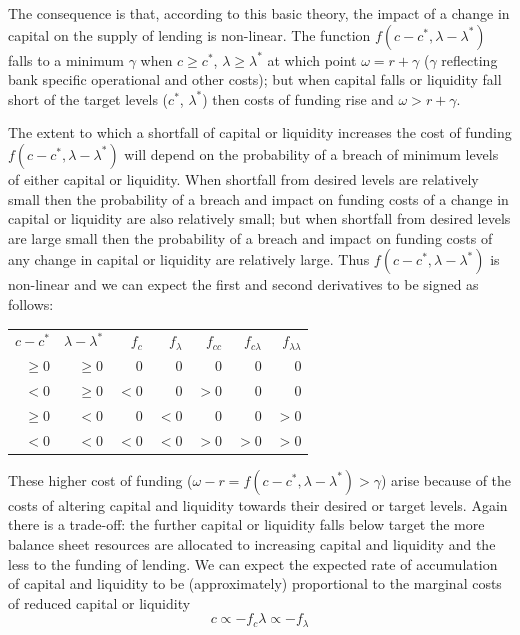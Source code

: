 \documentclass[
  12,
]{article}
\begin{document}
The consequence is that, according to this basic theory, the impact of a change in capital on the supply of lending is non-linear. The function \(f(c-c^\ast,\lambda-\lambda^\ast )\) falls to a minimum \(\gamma\) when \(c \geq c^\ast\), \(\lambda\geq\lambda^\ast\) at which point \(\omega=r+ \gamma\) (\(\gamma\) reflecting bank specific operational and other costs); but when capital falls or liquidity fall short of the target levels (\(c^\ast\), \(\lambda^\ast\)) then costs of funding rise and \(\omega >r+ \gamma\).

The extent to which a shortfall of capital or liquidity increases the cost of funding \(f(c-c^\ast,\lambda-\lambda^\ast)\) will depend on the probability of a breach of minimum levels of either capital or liquidity. When shortfall from desired levels are relatively small then the probability of a breach and impact on funding costs of a change in capital or liquidity are also relatively small; but when shortfall from desired levels are large small then the probability of a breach and impact on funding costs of any change in capital or liquidity are relatively large. Thus \(f(c-c^\ast,\lambda-\lambda^\ast)\) is non-linear and we can expect the first and second derivatives to be signed as follows:

\begin{center}
\begin{tabular}{ r r r r r r r}
$c-c^\ast$&$\lambda-\lambda^\ast$&$f_c$&$f_\lambda$&$f_{cc}$&$f_{c\lambda}$&$f_{\lambda\lambda}$\\
$\geq 0$&$\geq 0$&$0$&$0$&$0$&$0$&$0$\\
$<0$&$\geq 0$&$<0$&$0$&$>0$&$0$&$0$\\
$\geq 0$&$<0$&$0$&$<0$&$0$&$0$&$>0$\\
$<0$&$<0$&$<0$&$<0$&$>0$&$>0$&$>0$
\end{tabular}
\end{center}

These higher cost of funding (\(\omega - r = f(c-c^\ast,\lambda-\lambda^\ast )>\gamma\)) arise because of the costs of altering capital and liquidity towards their desired or target levels. Again there is a trade-off: the further capital or liquidity falls below target the more balance sheet resources are allocated to increasing capital and liquidity and the less to the funding of lending. We can expect the expected rate of accumulation of capital and liquidity to be (approximately) proportional to the marginal costs of reduced capital or liquidity
\[
c \propto -f_c
\lambda \propto -f_\lambda
\]
\end{document}
